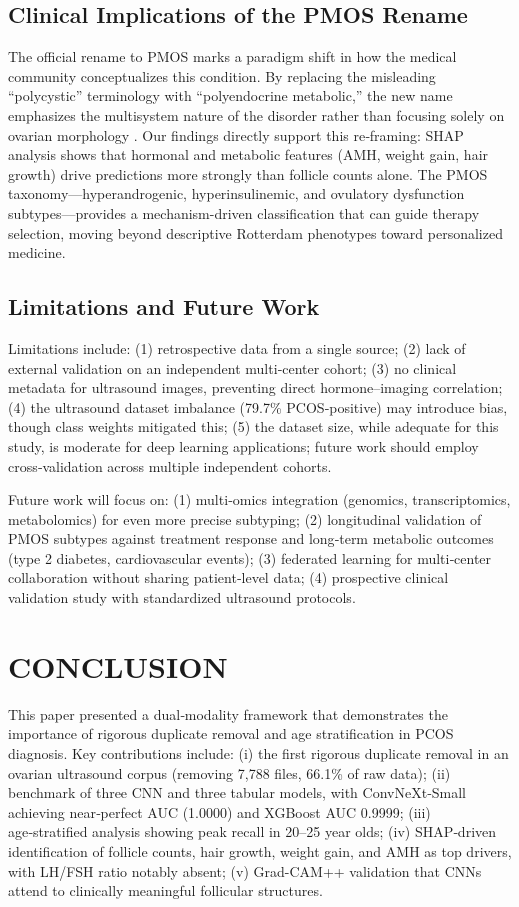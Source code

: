 \documentclass[conference]{IEEEtran}
\begin{document}
\subsection{Clinical Implications of the PMOS Rename}

The official rename to PMOS marks a paradigm shift in how the medical community conceptualizes this condition. By replacing the misleading “polycystic” terminology with “polyendocrine metabolic,” the new name emphasizes the multisystem nature of the disorder rather than focusing solely on ovarian morphology \cite{TeedeLancet2026}. Our findings directly support this re‑framing: SHAP analysis shows that hormonal and metabolic features (AMH, weight gain, hair growth) drive predictions more strongly than follicle counts alone. The PMOS taxonomy—hyperandrogenic, hyperinsulinemic, and ovulatory dysfunction subtypes—provides a mechanism-driven classification that can guide therapy selection, moving beyond descriptive Rotterdam phenotypes toward personalized medicine.

\subsection{Limitations and Future Work}

Limitations include: (1) retrospective data from a single source; (2) lack of external validation on an independent multi‑center cohort; (3) no clinical metadata for ultrasound images, preventing direct hormone–imaging correlation; (4) the ultrasound dataset imbalance (79.7\% PCOS‑positive) may introduce bias, though class weights mitigated this; (5) the dataset size, while adequate for this study, is moderate for deep learning applications; future work should employ cross‑validation across multiple independent cohorts.

Future work will focus on: (1) multi‑omics integration (genomics, transcriptomics, metabolomics) for even more precise subtyping; (2) longitudinal validation of PMOS subtypes against treatment response and long‑term metabolic outcomes (type 2 diabetes, cardiovascular events); (3) federated learning for multi‑center collaboration without sharing patient‑level data; (4) prospective clinical validation study with standardized ultrasound protocols.

\section{CONCLUSION}

This paper presented a dual‑modality framework that demonstrates the importance of rigorous duplicate removal and age stratification in PCOS diagnosis. Key contributions include: (i) the first rigorous duplicate removal in an ovarian ultrasound corpus (removing 7,788 files, 66.1\% of raw data); (ii) benchmark of three CNN and three tabular models, with ConvNeXt‑Small achieving near‑perfect AUC (1.0000) and XGBoost AUC 0.9999; (iii) age‑stratified analysis showing peak recall in 20–25 year olds; (iv) SHAP‑driven identification of follicle counts, hair growth, weight gain, and AMH as top drivers, with LH/FSH ratio notably absent; (v) Grad-CAM++ validation that CNNs attend to clinically meaningful follicular structures.
\end{document}
